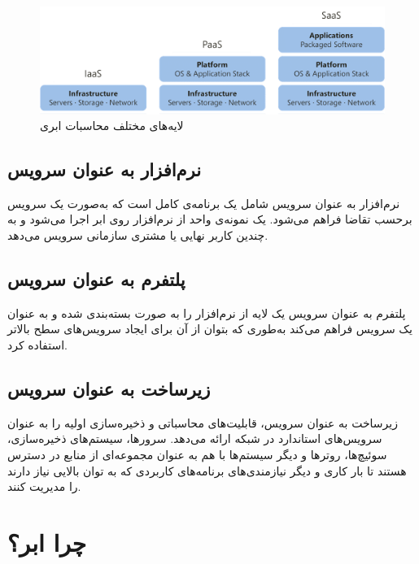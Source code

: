 \documentclass[a4paper,12pt]{book}
\begin{document}
	\begin{figure}[h]
		\centering
		\includegraphics[width=\textwidth]{1-1.png}
		\caption{ لایه‌های مختلف محاسبات ابری}
		\label{fig:11}
	\end{figure} 
	
	
	\subsection{ نرم‌افزار به عنوان سرویس}
	نرم‌افزار به عنوان سرویس شامل یک برنامه‌ی کامل است که به‌صورت یک سرویس برحسب تقاضا فراهم می‌شود. یک نمونه‌ی واحد از نرم‌افزار روی ابر اجرا می‌شود و به چندین کاربر نهایی یا مشتری سازمانی سرویس می‌دهد.  
	
	\subsection{ پلتفرم به عنوان سرویس}
	پلتفرم  به عنوان سرویس یک لایه از نرم‌افزار را به صورت بسته‌بندی شده و به عنوان یک سرویس فراهم می‌کند به‌طوری که بتوان از آن برای ایجاد سرویس‌های سطح بالاتر استفاده کرد. 
	
	\subsection{ زیرساخت به عنوان سرویس}
	
	زیرساخت به عنوان سرویس، قابلیت‌های محاسباتی و ذخیره‌سازی اولیه را به عنوان سرویس‌های استاندارد در شبکه ارائه می‌دهد. سرورها، سیستم‌های ذخیره‌سازی، سوئیچ‌ها، روترها و دیگر سیستم‌ها با هم به عنوان مجموعه‌ای از منابع در دسترس هستند تا بار کاری و دیگر نیازمندی‌های برنامه‌های کاربردی که به توان بالایی نیاز دارند را مدیریت کنند. 
	
	\section{چرا ابر؟}
	
\end{document}
